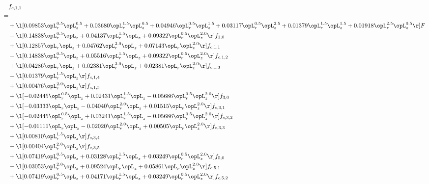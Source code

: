 \begin{alignat}{2} 
\label{eq:f_11_1} 
& f_{c,1,1} \nonumber \\ 
 = \\ 
& + \l[  0.09853 \opL_r^{0.5} \opL_z^{0.5} +  0.03680 \opL_r^{1.5} \opL_z^{0.5} +  0.04946 \opL_r^{0.5} \opL_z^{1.5} +  0.03117 \opL_r^{0.5} \opL_z^{2.5} +  0.01379 \opL_r^{1.5} \opL_z^{1.5} +  0.01918 \opL_r^{2.5} \opL_z^{0.5}  \r] F \nonumber \\ 
& - \l[  0.14838 \opL_r^{0.5} \opL_z +  0.04137 \opL_r^{1.5} \opL_z +  0.09322 \opL_r^{0.5} \opL_z^{2.0}  \r] f_{1,0} \nonumber \\ 
& + \l[  0.12857 \opL_r \opL_z +  0.04762 \opL_r^{2.0} \opL_z +  0.07143 \opL_r \opL_z^{2.0}  \r] f_{c,1,1} \nonumber \\ 
& - \l[  0.14838 \opL_r^{0.5} \opL_z +  0.05516 \opL_r^{1.5} \opL_z +  0.09322 \opL_r^{0.5} \opL_z^{2.0}  \r] f_{c,1,2} \nonumber \\ 
& + \l[  0.04286 \opL_r \opL_z +  0.02381 \opL_r^{2.0} \opL_z +  0.02381 \opL_r \opL_z^{2.0}  \r] f_{c,1,3} \nonumber \\ 
& - \l[  0.01379 \opL_r^{1.5} \opL_z  \r] f_{c,1,4} \nonumber \\ 
& + \l[  0.00476 \opL_r^{2.0} \opL_z  \r] f_{c,1,5} \nonumber \\ 
& + \l[  -0.02445 \opL_r^{0.5} \opL_z +  0.02431 \opL_r^{1.5} \opL_z   -0.05686 \opL_r^{0.5} \opL_z^{2.0}  \r] f_{3,0} \nonumber \\ 
& + \l[  -0.03333 \opL_r \opL_z   -0.04040 \opL_r^{2.0} \opL_z +  0.01515 \opL_r \opL_z^{2.0}  \r] f_{c,3,1} \nonumber \\ 
& + \l[  -0.02445 \opL_r^{0.5} \opL_z +  0.03241 \opL_r^{1.5} \opL_z   -0.05686 \opL_r^{0.5} \opL_z^{2.0}  \r] f_{c,3,2} \nonumber \\ 
& + \l[  -0.01111 \opL_r \opL_z   -0.02020 \opL_r^{2.0} \opL_z +  0.00505 \opL_r \opL_z^{2.0}  \r] f_{c,3,3} \nonumber \\ 
& + \l[  0.00810 \opL_r^{1.5} \opL_z  \r] f_{c,3,4} \nonumber \\ 
& - \l[  0.00404 \opL_r^{2.0} \opL_z  \r] f_{c,3,5} \nonumber \\ 
& + \l[  0.07419 \opL_r^{0.5} \opL_z +  0.03128 \opL_r^{1.5} \opL_z +  0.03249 \opL_r^{0.5} \opL_z^{2.0}  \r] f_{5,0} \nonumber \\ 
& - \l[  0.03053 \opL_r^{2.0} \opL_z +  0.09524 \opL_r \opL_z +  0.05861 \opL_r \opL_z^{2.0}  \r] f_{c,5,1} \nonumber \\ 
& + \l[  0.07419 \opL_r^{0.5} \opL_z +  0.04171 \opL_r^{1.5} \opL_z +  0.03249 \opL_r^{0.5} \opL_z^{2.0}  \r] f_{c,5,2} \nonumber \\ 

\end{alignat}
